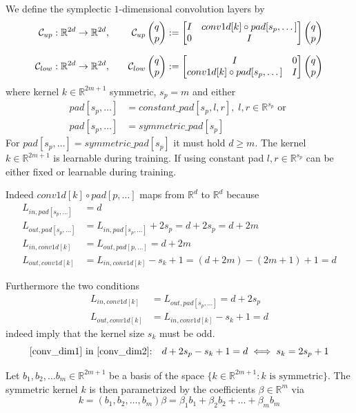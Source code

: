 \documentclass[twoside,a4paper]{article}
\begin{document}

We define the symplectic $1$-dimensional convolution layers by
\begin{alignat*}{2}
	\mathcal{C}_{up} &: \mathbb{R}^{2d} \to \mathbb{R}^{2d},
	\quad&\mathcal{C}_{up} \begin{pmatrix} q \\ p \end{pmatrix} := \begin{bmatrix} I & {conv1d[k] \circ pad[s_p,\dots]} \\ 0 & I \end{bmatrix} \begin{pmatrix} q \\ p \end{pmatrix} \\[7pt]
	\mathcal{C}_{low} &: \mathbb{R}^{2d} \to \mathbb{R}^{2d},
	&\mathcal{C}_{low} \begin{pmatrix} q \\ p \end{pmatrix} := \begin{bmatrix} I & 0 \\ {conv1d[k] \circ pad[s_p,\dots]} & I \end{bmatrix} \begin{pmatrix} q \\ p \end{pmatrix}
\end{alignat*}
where kernel $k \in \mathbb{R}^{2m+1}$ symmetric, $s_p = m$ and either
\begin{align*}
	pad[s_p,\dots] &= constant\_pad[s_p,l,r],\; l,r \in \mathbb{R}^{s_p} \text{ or } \\
	pad[s_p,\dots] &= symmetric\_pad[s_p]
\end{align*}
For $pad[s_p,\dots] = symmetric\_pad[s_p]$ it must hold $d \geq m$.
The kernel $k \in \mathbb{R}^{2m+1}$ is learnable during training.
If using constant pad $l,r \in \mathbb{R}^{s_p}$ can be either fixed or learnable during training.

Indeed $conv1d[k] \circ pad[p,\dots]$ maps from $\mathbb{R}^d$ to $\mathbb{R}^d$ because
\begin{align*}
	L_{in,pad[s_p,\dots]} &= d \\
	L_{out,pad[s_p,\dots]} &= L_{in,pad[s_p,\dots]} + 2s_p = d+2s_p = d+2m \\
	L_{in,conv1d[k]} &= L_{out,pad[p,\dots]} = d+2m \\
	L_{out,conv1d[k]} &= L_{in,conv1d[k]} - s_k + 1 = (d+2m) - (2m+1) + 1 = d
\end{align*}

Furthermore the two conditions
\begin{align}
	L_{in,conv1d[k]} &= L_{out,pad[s_p,\dots]} = d+2s_p \label{conv_dim1} \\ 
	L_{out,conv1d[k]} &= L_{in,conv1d[k]} - s_k + 1 = d \label{conv_dim2}
\end{align}
indeed imply that the kernel size $s_k$ must be odd.
\begin{equation*}
	\text{\cref{conv_dim1} in \cref{conv_dim2}:} \quad d+2s_p - s_k + 1 = d \iff s_k = 2s_p+1
\end{equation*}

Let ${b_1, b_2, \dots b_m} \in \mathbb{R}^{2m+1}$ be a basis of the space 
$\{ k \in \mathbb{R}^{2m+1} : k \text{ is symmetric} \}$.
The symmetric kernel $k$ is then parametrized by the coefficients $\beta \in \mathbb{R}^m$ via
\begin{equation*}
	k = (b_1, b_2, \dots, b_m) \beta = \beta_1 b_1 + \beta_2 b_2 + \dots + \beta_m b_m
\end{equation*}
\end{document}
